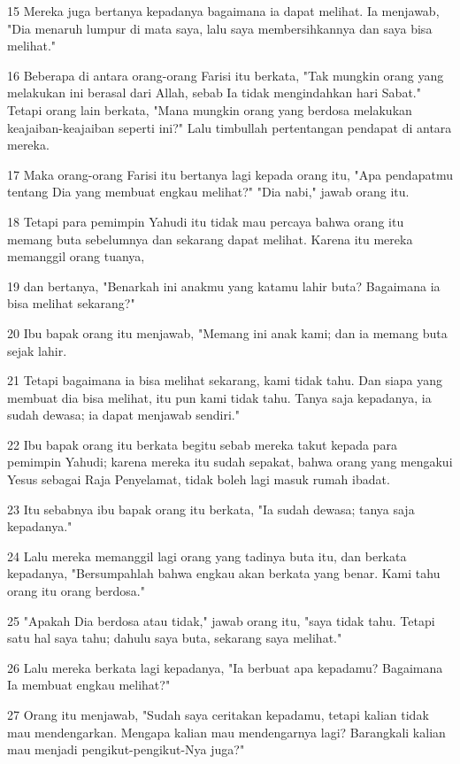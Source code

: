 \par 15 Mereka juga bertanya kepadanya bagaimana ia dapat melihat. Ia menjawab, "Dia menaruh lumpur di mata saya, lalu saya membersihkannya dan saya bisa melihat."
\par 16 Beberapa di antara orang-orang Farisi itu berkata, "Tak mungkin orang yang melakukan ini berasal dari Allah, sebab Ia tidak mengindahkan hari Sabat." Tetapi orang lain berkata, "Mana mungkin orang yang berdosa melakukan keajaiban-keajaiban seperti ini?" Lalu timbullah pertentangan pendapat di antara mereka.
\par 17 Maka orang-orang Farisi itu bertanya lagi kepada orang itu, "Apa pendapatmu tentang Dia yang membuat engkau melihat?" "Dia nabi," jawab orang itu.
\par 18 Tetapi para pemimpin Yahudi itu tidak mau percaya bahwa orang itu memang buta sebelumnya dan sekarang dapat melihat. Karena itu mereka memanggil orang tuanya,
\par 19 dan bertanya, "Benarkah ini anakmu yang katamu lahir buta? Bagaimana ia bisa melihat sekarang?"
\par 20 Ibu bapak orang itu menjawab, "Memang ini anak kami; dan ia memang buta sejak lahir.
\par 21 Tetapi bagaimana ia bisa melihat sekarang, kami tidak tahu. Dan siapa yang membuat dia bisa melihat, itu pun kami tidak tahu. Tanya saja kepadanya, ia sudah dewasa; ia dapat menjawab sendiri."
\par 22 Ibu bapak orang itu berkata begitu sebab mereka takut kepada para pemimpin Yahudi; karena mereka itu sudah sepakat, bahwa orang yang mengakui Yesus sebagai Raja Penyelamat, tidak boleh lagi masuk rumah ibadat.
\par 23 Itu sebabnya ibu bapak orang itu berkata, "Ia sudah dewasa; tanya saja kepadanya."
\par 24 Lalu mereka memanggil lagi orang yang tadinya buta itu, dan berkata kepadanya, "Bersumpahlah bahwa engkau akan berkata yang benar. Kami tahu orang itu orang berdosa."
\par 25 "Apakah Dia berdosa atau tidak," jawab orang itu, "saya tidak tahu. Tetapi satu hal saya tahu; dahulu saya buta, sekarang saya melihat."
\par 26 Lalu mereka berkata lagi kepadanya, "Ia berbuat apa kepadamu? Bagaimana Ia membuat engkau melihat?"
\par 27 Orang itu menjawab, "Sudah saya ceritakan kepadamu, tetapi kalian tidak mau mendengarkan. Mengapa kalian mau mendengarnya lagi? Barangkali kalian mau menjadi pengikut-pengikut-Nya juga?"
